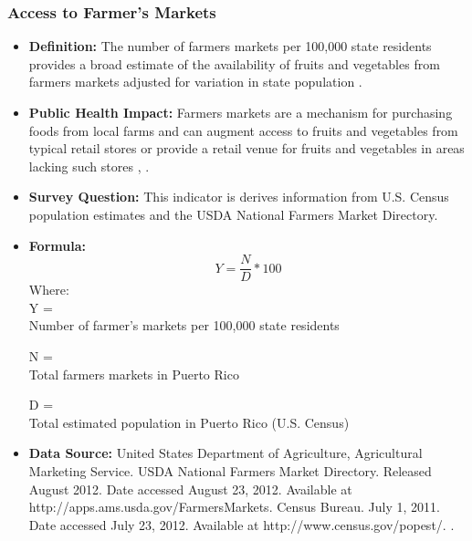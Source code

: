 \documentclass[12pt,letterpaper]{report}
\begin{document}
\subsubsection{Access to Farmer's Markets} 
	\begin{itemize}
		\item \textbf{Definition:} The number of farmers markets per 100,000 state residents provides a broad estimate of the availability of fruits and vegetables from farmers markets adjusted for variation in state population \cite{fruitandvegetable2013}. 
		\item \textbf{Public Health Impact:} Farmers markets are a mechanism for purchasing foods from local farms and can augment access to fruits and vegetables from typical retail stores or provide a retail venue for fruits and vegetables in areas lacking such stores \cite{centersstrategies}, \cite{story2008creating}.
		\item \textbf{Survey Question:}
				This indicator is derives information from U.S. Census population estimates and the USDA National Farmers Market Directory.
		\item \textbf{Formula:} 
			\begin{equation}
				Y = \frac{N}{D} *100
			\end{equation}
Where: \\
			Y = \\ Number of farmer's markets per 100,000 state residents
			
			N = \\ Total farmers markets in Puerto Rico
			
			D = \\ Total estimated population in Puerto Rico (U.S. Census)
			
		\item \textbf{Data Source:} United States Department of Agriculture, Agricultural Marketing Service. USDA National Farmers Market Directory. Released August 2012. Date accessed August 23, 2012.  Available at http://apps.ams.usda.gov/FarmersMarkets. Census Bureau. July 1, 2011. Date accessed July 23, 2012. 
Available at http://www.census.gov/popest/. \cite{fruitandvegetable2013}.

	\end{itemize}
\end{document}
